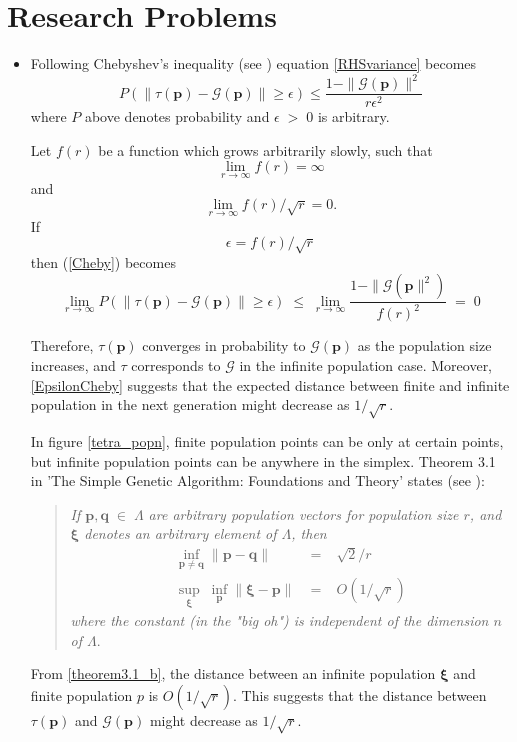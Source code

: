 \section{Research Problems}
\begin{itemize}
\item{
Following Chebyshev's inequality (see \cite{ChebyshevInequality}) equation \ref{RHSvariance} becomes  
\begin{equation}
\label{Cheby}
P(\| \tau (\bm{p}) - \mathcal{G}(\bm{p}) \| \geq \epsilon) \leq \frac{1 - \|\mathcal{G}(\bm{p})\|^2} {r{\epsilon}^2}
\end{equation}
where $P$ above denotes probability and $\epsilon \;>\; 0$ is arbitrary.

Let $f(r)$ be a function which grows arbitrarily slowly, such that 
\[
\lim_{r \to \infty} f(r)  =  \infty
\]
and
\[
\lim_{r \to \infty} f(r)/\sqrt{r}  =  0.
\]
If 
\begin{equation}
\label{EpsilonCheby}
\epsilon  =  f(r)/\sqrt{r}
\end{equation}
then (\ref{Cheby}) becomes
\begin{equation*}
\lim_{r \to \infty} P(\| \tau (\bm{p}) - \mathcal{G}(\bm{p}) \| \geq \epsilon) \; \leq \; \lim_{r \to \infty}\frac{1 - \|\mathcal{G}(\bm{p}\|^2)} {{f(r)}^2} \; = \; 0
\end{equation*}

Therefore, $\tau(\bm{p})$ converges in probability to $\mathcal{G}(\bm{p})$ as the population size increases, 
and $\tau$ corresponds to $\mathcal{G}$ 
in the infinite population case. Moreover, \ref{EpsilonCheby} suggests that the expected distance between finite and 
infinite population in the next generation might decrease as $1/\sqrt{r}$.

In figure \ref{tetra_popn}, finite population points can be only at certain points, but infinite population points can be anywhere in the simplex. 
Theorem 3.1 in 'The Simple Genetic Algorithm: Foundations and Theory' states (see \cite{Vose1999}):  
\begin{quote}
\emph{If $\bm{p},\bm{q} \;\in\; \Lambda$ are 
arbitrary population vectors for population size $r$, and $\bm{\xi}$ denotes an arbitrary element of $\Lambda$, then 
\begin{eqnarray}
\underset{\bm{p} \neq \bm{q}}{\inf} \|\bm{p} - \bm{q}\| &\;=\;& \sqrt{2}/r    \label{theorem3.1_a} \\
\underset{\bm{\xi}}{\sup} \; \underset{\bm{p}}{\inf} \|\bm{\xi} - \bm{p}\| &\;=\;& O(1/\sqrt{r})     \label{theorem3.1_b}
\end{eqnarray}
where the constant (in the "big oh") is independent of the dimension $n$ of $\Lambda$}.
\end{quote}
From \ref{theorem3.1_b}, the distance between an infinite population $\bm{\xi}$ and finite population $p$ is $O(1/\sqrt{r})$. 
This suggests that the distance between $\tau (\bm{p})$ and $\mathcal{G}(\bm{p})$ might decrease as $1/\sqrt{r}$.

}
\end{itemize}
